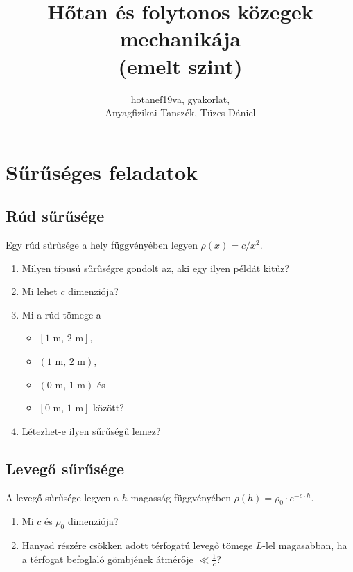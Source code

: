 \documentclass[12pt,a4paper]{scrartcl}
\begin{document}
\title{Hőtan és folytonos közegek mechanikája\\(emelt szint)}
\author{hotanef19va, gyakorlat,\\Anyagfizikai Tanszék, Tüzes Dániel}
\maketitle
\tableofcontents

\iffalse %
\section{Sűrűséges feladatok}
\subsection{Rúd sűrűsége}
Egy rúd sűrűsége a hely függvényében legyen $\rho \left( x \right) = c/{x^2}$.
\begin{enumerate}
\item Milyen típusú sűrűségre gondolt az, aki egy ilyen példát kitűz?
\item Mi lehet $c$ dimenziója?
\item Mi a rúd tömege a
\begin{itemize}
\item $\left[ 1{\text{ m, }}2{\text{ m}} \right]$,
\item $\left( 1{\text{ m, }}2{\text{ m}} \right)$,
\item ${\left( {0{\text{ m, }}1{\text{ m}}} \right)}$ és
\item ${\left[ {0{\text{ m, }}1{\text{ m}}} \right]}$ között?
\end{itemize}
\item Létezhet-e ilyen sűrűségű lemez?
\end{enumerate}
\subsection{Levegő sűrűsége}
A levegő sűrűsége legyen a $h$ magasság függvényében $\rho \left( h \right) = {\rho _0} \cdot {e^{ - c \cdot h}}$.
\begin{enumerate}
\item Mi $c$ és $\rho_0$ dimenziója?
\item Hanyad részére csökken adott térfogatú levegő tömege $L$-lel magasabban, ha a térfogat befoglaló gömbjének átmérője $ \ll \frac{1}{c}$?
\end{enumerate}
\end{document}
